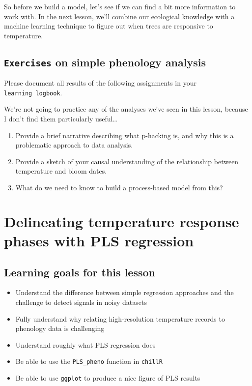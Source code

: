 \documentclass[
]{book}
\providecommand{\tightlist}{%
  \setlength{\itemsep}{0pt}\setlength{\parskip}{0pt}}
\begin{document}
So before we build a model, let's see if we can find a bit more information to work with. In the next lesson, we'll combine our ecological knowledge with a machine learning technique to figure out when trees are responsive to temperature.

\hypertarget{exercises_simple_analysis}{%
\section*{\texorpdfstring{\texttt{Exercises} on simple phenology analysis}{Exercises on simple phenology analysis}}\label{exercises_simple_analysis}}

Please document all results of the following assignments in your \texttt{learning\ logbook}.

We're not going to practice any of the analyses we've seen in this lesson, because I don't find them particularly useful\ldots{}

\begin{enumerate}
\def\labelenumi{\arabic{enumi})}
\tightlist
\item
  Provide a brief narrative describing what p-hacking is, and why this is a problematic approach to data analysis.
\item
  Provide a sketch of your causal understanding of the relationship between temperature and bloom dates.
\item
  What do we need to know to build a process-based model from this?
\end{enumerate}

\hypertarget{pls_intro}{%
\chapter{Delineating temperature response phases with PLS regression}\label{pls_intro}}

\hypertarget{goals_PLS_intro}{%
\section*{Learning goals for this lesson}\label{goals_PLS_intro}}

\begin{itemize}
\tightlist
\item
  Understand the difference between simple regression approaches and the challenge to detect signals in noisy datasets
\item
  Fully understand why relating high-resolution temperature records to phenology data is challenging
\item
  Understand roughly what PLS regression does
\item
  Be able to use the \texttt{PLS\_pheno} function in \texttt{chillR}
\item
  Be able to use \texttt{ggplot} to produce a nice figure of PLS results
\end{itemize}
\end{document}
